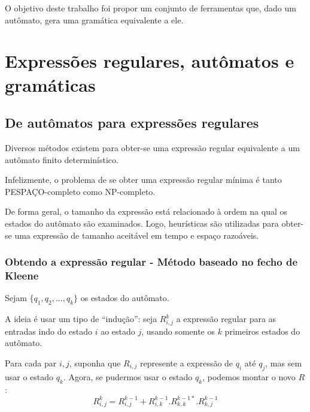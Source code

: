 \documentclass[a4 paper, 12pt]{article}
\begin{document}
O objetivo deste trabalho foi propor um conjunto de ferramentas que,
dado um aut\^omato, gera uma gram\'atica equivalente a ele.


\section{Express\~oes regulares,  aut\^omatos e gram\'aticas}
\subsection{De aut\^omatos para express\~oes regulares}
Diversos m\'etodos existem para obter-se uma express\~ao regular
equivalente a um aut\^omato finito determin\'istico\cite{review1,
  review2}.

Infelizmente, o problema de se obter uma express\~ao regular m\'inima
\'e tanto PESPA\c CO-completo como NP-completo\cite{npcomplete}.

De forma geral, o tamanho da express\~ao est\'a relacionado \`a ordem
na qual os estados do aut\^omato s\~ao examinados. Logo, heur\'isticas
s\~ao utilizadas para obter-se uma express\~ao de tamanho aceit\'avel
em tempo e espa\c co razo\'aveis.

\subsubsection{Obtendo a express\~ao regular - M\'etodo baseado no fecho de Kleene}
Sejam $\{q_1, q_2, \ldots, q_k\}$ os estados do aut\^omato.

A ideia \'e usar um tipo de ``indu\c c\~ao'': seja $R_{i,j}^k$
a express\~ao regular para as entradas indo do estado $i$ ao estado
$j$, usando somente os $k$ primeiros estados do aut\^omato.

Para cada par $i, j$, suponha que $R_{i,j}$ represente a express\~ao
de $q_i$ at\'e $q_j$, mas sem usar o estado $q_k$. Agora, se pudermos
usar o estado $q_k$, podemos montar o novo $R$:
\begin{equation}
  \label{eq:1}
  R_{i,j}^{k} = R_{i,j}^{k-1} + R_{i,k}^{k-1} . R_{k,k}^{k-1*}. R_{k,j}^{k-1}
\end{equation}
\end{document}
